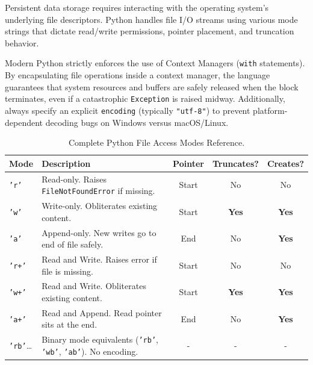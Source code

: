 Persistent data storage requires interacting with the operating system's underlying file descriptors. Python handles file I/O streams using various mode strings that dictate read/write permissions, pointer placement, and truncation behavior. 

Modern Python strictly enforces the use of Context Managers (\texttt{with} statements). By encapsulating file operations inside a context manager, the language guarantees that system resources and buffers are safely released when the block terminates, even if a catastrophic \texttt{Exception} is raised midway. Additionally, always specify an explicit \texttt{encoding} (typically \texttt{"utf-8"}) to prevent platform-dependent decoding bugs on Windows versus macOS/Linux. \enrichBadge

\begin{table}[htbp]
\centering
\small
\renewcommand{\arraystretch}{1.3}
\begin{tabularx}{\linewidth}{l>{\raggedright\arraybackslash}Xccc}
\toprule
\textbf{Mode} & \textbf{Description} & \textbf{Pointer} & \textbf{Truncates?} & \textbf{Creates?} \\
\midrule
\texttt{'r'} & Read-only. Raises \texttt{FileNotFoundError} if missing. & Start & No & No \\
\texttt{'w'} & Write-only. Obliterates existing content. & Start & \textbf{Yes} & \textbf{Yes} \\
\texttt{'a'} & Append-only. New writes go to end of file safely. & End & No & \textbf{Yes} \\
\texttt{'r+'} & Read and Write. Raises error if file is missing. & Start & No & No \\
\texttt{'w+'} & Read and Write. Obliterates existing content. & Start & \textbf{Yes} & \textbf{Yes} \\
\texttt{'a+'} & Read and Append. Read pointer sits at the end. & End & No & \textbf{Yes} \\
\texttt{'rb'}\dots & Binary mode equivalents (\texttt{'rb'}, \texttt{'wb'}, \texttt{'ab'}). No encoding. & - & - & - \\
\bottomrule
\end{tabularx}
\caption{Complete Python File Access Modes Reference.}
\label{tab:master-file-modes}
\end{table}

